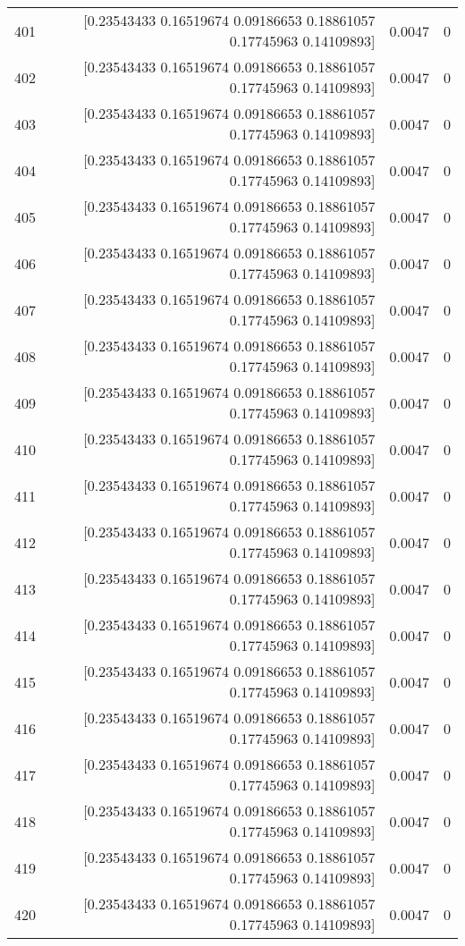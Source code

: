 \begin{longtable}{lrrr}
401 & [0.23543433 0.16519674 0.09186653 0.18861057 0.17745963 0.14109893] & 0.0047 & 0 \\
402 & [0.23543433 0.16519674 0.09186653 0.18861057 0.17745963 0.14109893] & 0.0047 & 0 \\
403 & [0.23543433 0.16519674 0.09186653 0.18861057 0.17745963 0.14109893] & 0.0047 & 0 \\
404 & [0.23543433 0.16519674 0.09186653 0.18861057 0.17745963 0.14109893] & 0.0047 & 0 \\
405 & [0.23543433 0.16519674 0.09186653 0.18861057 0.17745963 0.14109893] & 0.0047 & 0 \\
406 & [0.23543433 0.16519674 0.09186653 0.18861057 0.17745963 0.14109893] & 0.0047 & 0 \\
407 & [0.23543433 0.16519674 0.09186653 0.18861057 0.17745963 0.14109893] & 0.0047 & 0 \\
408 & [0.23543433 0.16519674 0.09186653 0.18861057 0.17745963 0.14109893] & 0.0047 & 0 \\
409 & [0.23543433 0.16519674 0.09186653 0.18861057 0.17745963 0.14109893] & 0.0047 & 0 \\
410 & [0.23543433 0.16519674 0.09186653 0.18861057 0.17745963 0.14109893] & 0.0047 & 0 \\
411 & [0.23543433 0.16519674 0.09186653 0.18861057 0.17745963 0.14109893] & 0.0047 & 0 \\
412 & [0.23543433 0.16519674 0.09186653 0.18861057 0.17745963 0.14109893] & 0.0047 & 0 \\
413 & [0.23543433 0.16519674 0.09186653 0.18861057 0.17745963 0.14109893] & 0.0047 & 0 \\
414 & [0.23543433 0.16519674 0.09186653 0.18861057 0.17745963 0.14109893] & 0.0047 & 0 \\
415 & [0.23543433 0.16519674 0.09186653 0.18861057 0.17745963 0.14109893] & 0.0047 & 0 \\
416 & [0.23543433 0.16519674 0.09186653 0.18861057 0.17745963 0.14109893] & 0.0047 & 0 \\
417 & [0.23543433 0.16519674 0.09186653 0.18861057 0.17745963 0.14109893] & 0.0047 & 0 \\
418 & [0.23543433 0.16519674 0.09186653 0.18861057 0.17745963 0.14109893] & 0.0047 & 0 \\
419 & [0.23543433 0.16519674 0.09186653 0.18861057 0.17745963 0.14109893] & 0.0047 & 0 \\
420 & [0.23543433 0.16519674 0.09186653 0.18861057 0.17745963 0.14109893] & 0.0047 & 0 \\

\end{longtable}
